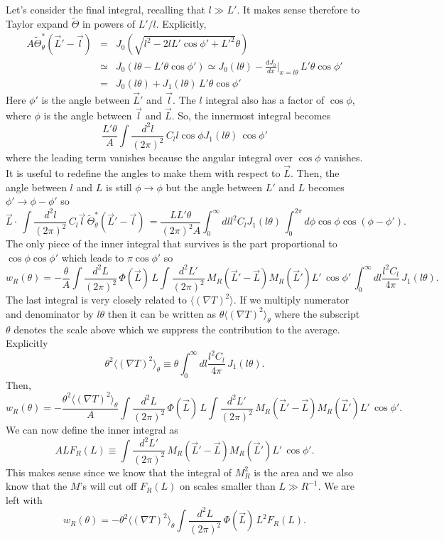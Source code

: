 \documentclass[prd,amsmath,amssymb,floatfix,superscriptaddress,nofootinbib]{revtex4-1}
\def\be{\begin{equation}}
\def\ee{\end{equation}}
\def\bea{\begin{eqnarray}}
\def\eea{\end{eqnarray}}
\newcommand{\vs}{\nonumber\\}
\newcommand{\eql}[1]{\label{eq:#1}}
\begin{document}
Let's consider the final integral, recalling that $l\gg L'$. It makes sense therefore to Taylor expand $\tilde\Theta$ in powers of $L'/l$. Explicitly,
\bea
A\tilde \Theta_\theta^*(\vec L'-\vec l) &=& J_0(\sqrt{l^2-2lL'\cos\phi'+L'^2}\theta)
\vs
&\simeq& J_0\left(l\theta - L'\theta\cos\phi'\right)
\simeq
J_0(l\theta) - \frac{dJ_0}{dx}\bigg\vert_{x=l\theta}\, L'\theta\cos\phi'
\vs
&=&J_0(l\theta) + J_1(l\theta)\, L'\theta\cos\phi'
\eea
Here $\phi'$ is the angle between $\vec L'$ and $\vec l$. The $l$ integral also has a factor of $\cos\phi$, where $\phi$ is the angle between $\vec l$ and $\vec L$. So, the innermost integral becomes
\be
\frac{L'\theta}A\int \frac{d^2l}{(2\pi)^2}\,C_{l} l\cos\phi J_1(l\theta)\, \cos\phi'\ee
where the leading term vanishes because the angular integral over $\cos\phi$ vanishes. It is useful to redefine the angles to make them with respect to $\vec L$. Then, the angle between $l$ and $L$ is still $\phi\rightarrow \phi$ but the angle between $L'$ and $L$ becomes $\phi'\rightarrow \phi-\phi'$ so 
\be
\vec L\cdot\,\int \frac{d^2l}{(2\pi)^2}\,C_{l}\vec l\,\tilde \Theta_\theta^*(\vec L'-\vec l)\, 
= \frac{LL'\theta}{(2\pi)^2A} \int_0^\infty dl l^2C_l J_1(l\theta) \,\int_0^{2\pi} d\phi\cos\phi \cos(\phi-\phi').
\ee
The only piece of the inner integral that survives is the part proportional to $\cos\phi\cos\phi'$ which leads to $\pi\cos\phi'$ so
\be
w_R(\theta) =  - \frac{\theta}{A} \int \frac{d^2L}{(2\pi)^2}\, \Phi(\vec L)\, L 
\int \frac{d^2L'}{(2\pi)^2}\, M_R(\vec L'-\vec L)  M_R(\vec L')L'\,\cos\phi'
\,\int_0^\infty dl \frac{l^2C_l}{4\pi}\,J_1(l\theta)  .
\ee
The last integral is very closely related to $\langle (\nabla T)^2\rangle$. If we multiply numerator and denominator by $l\theta$ then it can be written as $\theta\langle (\nabla T)^2\rangle_\theta$ where the subscript $\theta$ denotes the scale above which we suppress the contribution to the average. Explicitly
\be
\theta^2\langle (\nabla T)^2\rangle_\theta \equiv \theta\int_0^\infty dl \frac{l^2C_l}{4\pi}\,J_1(l\theta).\eql{dlnt}\ee
Then,
\be
w_R(\theta) =  - \frac{\theta^2\langle (\nabla T)^2\rangle_\theta}{A} \int \frac{d^2L}{(2\pi)^2}\, \Phi(\vec L)\, L 
\int \frac{d^2L'}{(2\pi)^2}\, M_R(\vec L'-\vec L)  M_R(\vec L')L'\,\cos\phi'.\ee
We can now define the inner integral as
\be
ALF_R(L) \equiv \int \frac{d^2L'}{(2\pi)^2}\, M_R(\vec L'-\vec L)  M_R(\vec L')L'\,\cos\phi'.\ee
This makes sense since we know that the integral of $M_R^2$ is the area and we also know that the $M$'s will cut off $F_R(L)$ on scales smaller than $L\gg R^{-1}$. We are left with
\be
w_R(\theta) =  - {\theta^2\langle (\nabla T)^2\rangle_\theta} \int \frac{d^2L}{(2\pi)^2}\, \Phi(\vec L)\, L^2 F_R(L) 
.\ee
\end{document}
